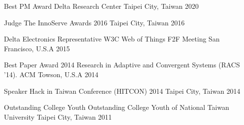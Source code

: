 
\begin{cvhonors}

  \cvhonor
    {Best PM Award} %
    {Delta Research Center} %
    {Taipei City, Taiwan} %
    {2020} %

  \cvhonor
    {Judge} %
    {The InnoServe Awards 2016} %
    {Taipei City, Taiwan} %
    {2016} %

  \cvhonor
    {Delta Electronics Representative} %
    {W3C Web of Things F2F Meeting} %
    {San Francisco, U.S.A} %
    {2015} %

  \cvhonor
    {Best Paper Award} %
    {2014 Research in Adaptive and Convergent Systems (RACS '14). ACM} %
    {Towson, U.S.A} %
    {2014} %

  \cvhonor
    {Speaker} %
    {Hack in Taiwan Conference (HITCON) 2014} %
    {Taipei City, Taiwan} %
    {2014} %

  \cvhonor
    {Outstanding College Youth} %
    {Outstanding College Youth of National Taiwan University} %
    {Taipei City, Taiwan} %
    {2011} %

\end{cvhonors}
